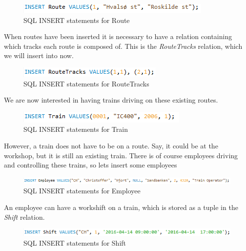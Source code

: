 \begin{figure}[ht!]
    \centering
    \includegraphics[width=.6\textwidth]{img/INSERT_Statements_Route}
    \caption{SQL INSERT statements for Route}
    \label{fig:ER}
\end{figure}

When routes have been inserted it is necessary to have a relation containing which tracks each route is composed of. This is the \emph{RouteTracks} relation, which we will insert into now.

\begin{figure}[ht!]
    \centering
    \includegraphics[width=.5\textwidth]{img/INSERT_Statements_RouteTracks}
    \caption{SQL INSERT statements for RouteTracks}
    \label{fig:ER}
\end{figure}

We are now interested in having trains driving on these existing routes.

\begin{figure}[ht!]
    \centering
    \includegraphics[width=.5\textwidth]{img/INSERT_Statements_Train}
    \caption{SQL INSERT statements for Train}
    \label{fig:ER}
\end{figure}

However, a train does not have to be on a route. Say, it could be at the workshop, but it is still an existing train.
\newpage
There is of course employees driving and controlling these trains, so lets insert some employees

\begin{figure}[ht!]
    \centering
    \includegraphics[width=1\textwidth]{img/INSERT_Statements_Employee}
    \caption{SQL INSERT statements for Employee}
    \label{fig:ER}
\end{figure}

An employee can have a workshift on a train, which is stored as a tuple in the \emph{Shift} relation.

\begin{figure}[ht!]
    \centering
    \includegraphics[width=.9\textwidth]{img/INSERT_Statements_Shift}
    \caption{SQL INSERT statements for Shift}
    \label{fig:ER}
\end{figure}

